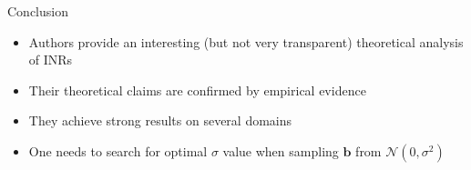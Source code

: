\documentclass[handout, 10pt]{beamer}
\begin{document}
\begin{frame}{Conclusion}
\begin{itemize}
    \item\pause Authors provide an interesting (but not very transparent) theoretical analysis of INRs
    \item\pause Their theoretical claims are confirmed by empirical evidence
    \item\pause They achieve strong results on several domains
    \item\pause One needs to search for optimal $\sigma$ value when sampling $\bm b$ from $\mathcal{N}(0, \sigma^2)$
\end{itemize}    
\end{frame}
\end{document}
